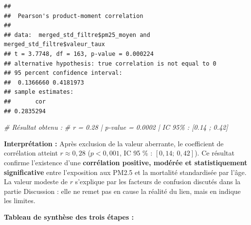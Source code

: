 \documentclass[mstat,12pt]{unswthesis}
\newenvironment{Shaded}{\begin{snugshade}}{\end{snugshade}}
\newcommand{\AttributeTok}[1]{\textcolor[rgb]{0.13,0.29,0.53}{#1}}
\newcommand{\CommentTok}[1]{\textcolor[rgb]{0.56,0.35,0.01}{\textit{#1}}}
\newcommand{\FunctionTok}[1]{\textcolor[rgb]{0.13,0.29,0.53}{\textbf{#1}}}
\newcommand{\NormalTok}[1]{#1}
\newcommand{\OtherTok}[1]{\textcolor[rgb]{0.56,0.35,0.01}{#1}}
\newcommand{\SpecialCharTok}[1]{\textcolor[rgb]{0.81,0.36,0.00}{\textbf{#1}}}
\newcommand{\StringTok}[1]{\textcolor[rgb]{0.31,0.60,0.02}{#1}}
\begin{document}
\begin{Shaded}
\end{Shaded}

\begin{verbatim}
## 
##  Pearson's product-moment correlation
## 
## data:  merged_std_filtre$pm25_moyen and merged_std_filtre$valeur_taux
## t = 3.7748, df = 163, p-value = 0.000224
## alternative hypothesis: true correlation is not equal to 0
## 95 percent confidence interval:
##  0.1366660 0.4181973
## sample estimates:
##       cor 
## 0.2835294
\end{verbatim}

\begin{Shaded}
\begin{Highlighting}[]
\CommentTok{\# Résultat obtenu :}
\CommentTok{\#   r = 0.28  |  p{-}value = 0.0002  |  IC 95\% : [0.14 ; 0.42]}
\end{Highlighting}
\end{Shaded}

\textbf{Interprétation :} Après exclusion de la valeur aberrante, le
coefficient de corrélation atteint \(r \approx 0{,}28\)
(\(p < 0{,}001\), IC 95 \% : \([0{,}14 ;\ 0{,}42]\)). Ce résultat
confirme l'existence d'une \textbf{corrélation positive, modérée et
statistiquement significative} entre l'exposition aux PM2.5 et la
mortalité standardisée par l'âge. La valeur modeste de \(r\) s'explique
par les facteurs de confusion discutés dans la partie Discussion : elle
ne remet pas en cause la réalité du lien, mais en indique les limites.

\medskip

\noindent\textbf{Tableau de synthèse des trois étapes :}
\end{document}
